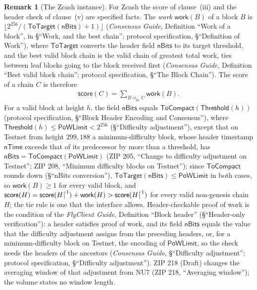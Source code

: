 \documentclass[11pt,a4paper]{article}
\theoremstyle{definition}
\newtheorem{remark}[theorem]{Remark}
\newcommand{\bc}{\mathrm{bc}}
\newcommand{\score}{\mathsf{score}}
\newcommand{\work}{\mathsf{work}}
\begin{document}
\begin{remark}[The Zcash instance]\label{rem:bc-zcash}
For Zcash the score of clause~(iii) and the header check of clause~(v) are
specified facts. The \emph{work} $\work(B)$ of a block $B$ is
$\lfloor 2^{256} / (\mathsf{ToTarget}(\mathsf{nBits}) + 1) \rfloor$
(\emph{Consensus Guide}, Definition ``Work of a block'', in \S``Work, and the
best chain''; protocol specification, \S``Definition of Work''), where
$\mathsf{ToTarget}$ converts the header field $\mathsf{nBits}$ to its target
threshold, and the best valid block chain is the valid chain of greatest total
work, ties between leaf blocks going to the block received first
(\emph{Consensus Guide}, Definition ``Best valid block chain''; protocol
specification, \S``The Block Chain''). The score of a chain $C$ is therefore
\begin{gather*}
  \score(C) = \sum_{B \preceq_{\bc} C} \work(B).
\end{gather*}
For a valid block at height $h$, the field $\mathsf{nBits}$ equals
$\mathsf{ToCompact}(\mathsf{Threshold}(h))$ (protocol specification,
\S``Block Header Encoding and Consensus''), where $\mathsf{Threshold}(h) \le
\mathsf{PoWLimit} < 2^{256}$ (\S``Difficulty adjustment''), except that on
Testnet from height $299{,}188$ a minimum-difficulty block, whose header
timestamp $\mathsf{nTime}$ exceeds that of its predecessor by more than a
threshold,
has $\mathsf{nBits} = \mathsf{ToCompact}(\mathsf{PoWLimit})$ (ZIP 205,
``Change to difficulty adjustment on Testnet''; ZIP 208, ``Minimum difficulty
blocks on Testnet''); since $\mathsf{ToCompact}$ rounds down (\S``nBits
conversion''), $\mathsf{ToTarget}(\mathsf{nBits}) \le \mathsf{PoWLimit}$ in
both cases, so $\work(B) \ge 1$ for every valid block, and $\score(H) =
\score(H\trunc{1}) + \work(H) > \score(H\trunc{1})$ for every valid non-genesis
chain $H$; the tie rule is one that the interface allows. Header-checkable proof
of work is the condition of the \emph{FlyClient Guide}, Definition ``Block
header'' (\S``Header-only verification''): a header satisfies proof of work, and
its field $\mathsf{nBits}$ equals the value that the difficulty adjustment
assigns from the preceding headers, or, for a minimum-difficulty block on
Testnet, the encoding of $\mathsf{PoWLimit}$, so the check needs the headers of
the ancestors (\emph{Consensus Guide}, \S``Difficulty adjustment''; protocol
specification, \S``Difficulty adjustment''). ZIP 218 (Draft) changes the
averaging window of that adjustment from NU7 (ZIP 218, ``Averaging window'');
the volume states no window length.
\end{remark}
\end{document}
